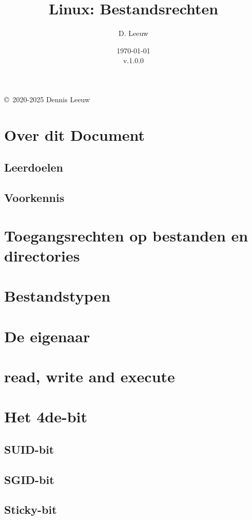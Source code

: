 \documentclass[a4paper,12pt,twoside,openright,titlepage]{book}
\author{D. Leeuw}
\title{Linux: Bestandsrechten}
\date{\today\\v.1.0.0}
\begin{document}

\maketitle

\copyright\ 2020-2025 Dennis Leeuw\\




\frontmatter
\chapter{Over dit Document}
\section{Leerdoelen}

\section{Voorkennis}

%
%

\tableofcontents

\mainmatter

\chapter{Toegangsrechten op bestanden en directories}


\chapter{Bestandstypen}

\chapter{De eigenaar}

\chapter{read, write and execute}


\chapter{Het 4de-bit}

\section{SUID-bit}

\section{SGID-bit}

\section{Sticky-bit}


\backmatter
\printindex
\end{document}
